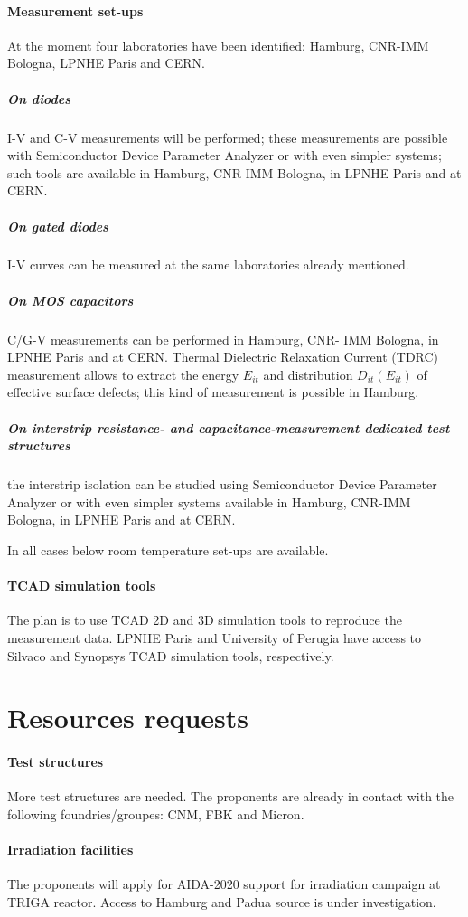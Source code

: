 \documentclass[dvips,12pt]{article}
\begin{document}
\paragraph{Measurement set-ups} At the moment four laboratories have been identified: Hamburg, CNR-IMM Bologna, LPNHE Paris and CERN.

\subparagraph{On diodes} I-V and C-V measurements will be performed; these 
measurements are possible with Semiconductor Device Parameter Analyzer or 
with even simpler systems; such tools are available in Hamburg, CNR-IMM Bologna, in LPNHE Paris
and at CERN. 

\subparagraph{On gated diodes} I-V curves can be measured at the same laboratories
 already mentioned.

\subparagraph{On MOS capacitors}  C/G-V measurements can be performed in Hamburg, CNR-
IMM Bologna, in  LPNHE Paris and at CERN. Thermal Dielectric Relaxation Current (TDRC) 
measurement allows to extract the energy 
 $E_{it}$ and distribution  $D_{it}(E_{it})$ of effective surface defects; this kind of measurement 
 is possible in Hamburg.

\subparagraph{On  interstrip resistance- and capacitance-measurement dedicated test structures} 
the interstrip isolation  can be studied  using 
Semiconductor Device Parameter Analyzer or with even simpler systems available in Hamburg, CNR-IMM Bologna, in LPNHE Paris
and at CERN. 

\noindent In all cases below room temperature set-ups are available.

\paragraph{TCAD simulation tools}The plan is to use TCAD 2D and 3D simulation tools 
to reproduce the measurement data. LPNHE Paris and University of Perugia have access to 
Silvaco and Synopsys TCAD simulation tools, respectively. 

\section{Resources requests}
\label{sec:resources}
\paragraph{Test structures}More test structures are needed. The proponents are already 
in contact with the following foundries/groupes: CNM, FBK and Micron.
\paragraph{Irradiation facilities}The proponents will apply for AIDA-2020 support for irradiation 
campaign at TRIGA reactor. Access to Hamburg and Padua source is under investigation.
\end{document}
